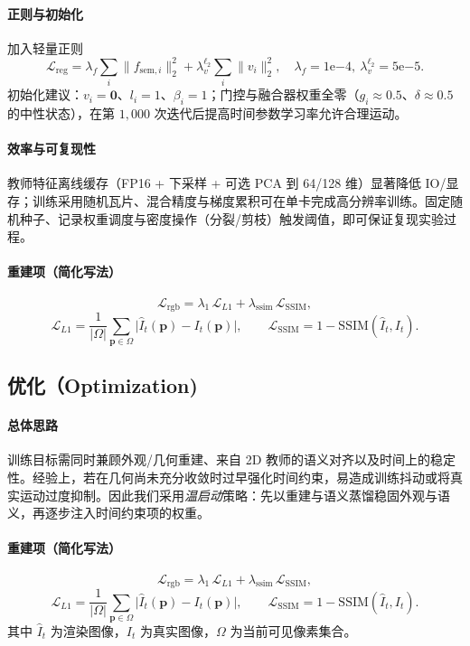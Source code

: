 \documentclass[10pt,conference]{IEEEtran} %
\begin{document}
\paragraph{正则与初始化}
加入轻量正则
\begin{equation}
\mathcal L_{\mathrm{reg}}=\lambda_f\sum_i \|f_{\mathrm{sem},i}\|_2^2+\lambda_v^{\ell_2}\sum_i \|v_i\|_2^2,
\quad \lambda_f{=}1\mathrm{e}{-4},\ \lambda_v^{\ell_2}{=}5\mathrm{e}{-5}.
\end{equation}
初始化建议：$v_i{=}\mathbf 0$、$l_i{=}1$、$\beta_i{=}1$；门控与融合器权重全零（$g_i{\approx}0.5$、$\delta{\approx}0.5$ 的中性状态），在第 $1{,}000$ 次迭代后提高时间参数学习率允许合理运动。

\paragraph{效率与可复现性}
教师特征离线缓存（FP16 + 下采样 + 可选 PCA 到 64/128 维）显著降低 IO/显存；训练采用随机瓦片、混合精度与梯度累积可在单卡完成高分辨率训练。固定随机种子、记录权重调度与密度操作（分裂/剪枝）触发阈值，即可保证复现实验过程。

\paragraph{重建项（简化写法）}
\begin{equation}
\mathcal L_{\mathrm{rgb}}=\lambda_{1}\,\mathcal L_{L1}+\lambda_{\mathrm{ssim}}\,\mathcal L_{\mathrm{SSIM}},
\end{equation}
\begin{equation}
\mathcal L_{L1}=\frac{1}{|\Omega|}\sum_{\mathbf p\in\Omega}\big| \hat I_t(\mathbf p)-I_t(\mathbf p) \big|,\qquad
\mathcal L_{\mathrm{SSIM}}=1-\mathrm{SSIM}(\hat I_t,I_t).
\end{equation}


\subsection{优化（Optimization)}
\paragraph{总体思路}
训练目标需同时兼顾外观/几何重建、来自 2D 教师的语义对齐以及时间上的稳定性。经验上，若在几何尚未充分收敛时过早强化时间约束，易造成训练抖动或将真实运动过度抑制。因此我们采用\emph{温启动}策略：先以重建与语义蒸馏稳固外观与语义，再逐步注入时间约束项的权重。

\paragraph{重建项（简化写法）}
\begin{equation}
\mathcal L_{\mathrm{rgb}}=\lambda_{1}\,\mathcal L_{L1}+\lambda_{\mathrm{ssim}}\,\mathcal L_{\mathrm{SSIM}},
\end{equation}
\begin{equation}
\mathcal L_{L1}=\frac{1}{|\Omega|}\sum_{\mathbf p\in\Omega}\big|\hat I_t(\mathbf p)-I_t(\mathbf p)\big|,\qquad
\mathcal L_{\mathrm{SSIM}}=1-\mathrm{SSIM}(\hat I_t,I_t).
\end{equation}
其中 $\hat I_t$ 为渲染图像，$I_t$ 为真实图像，$\Omega$ 为当前可见像素集合。
\end{document}
